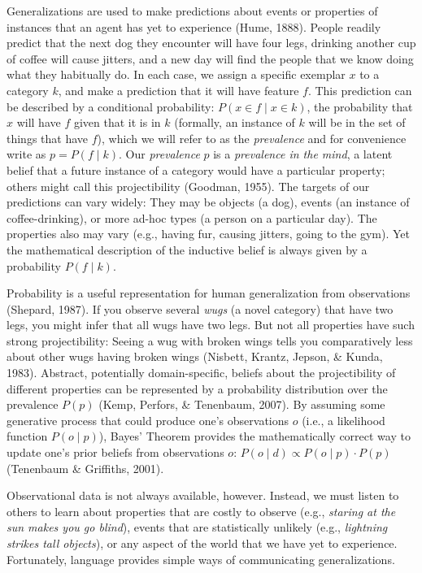 \documentclass[english,,man,floatsintext]{apa6}
\theoremstyle{definition}
\theoremstyle{definition}
\theoremstyle{definition}
\theoremstyle{remark}
\begin{document}
Generalizations are used to make predictions about events or properties
of instances that an agent has yet to experience (Hume, 1888). People
readily predict that the next dog they encounter will have four legs,
drinking another cup of coffee will cause jitters, and a new day will
find the people that we know doing what they habitually do. In each
case, we assign a specific exemplar \(x\) to a category \(k\), and make
a prediction that it will have feature \(f\). This prediction can be
described by a conditional probability: \(P(x \in f \mid x \in k)\), the
probability that \(x\) will have \(f\) given that it is in \(k\)
(formally, an instance of \(k\) will be in the set of things that have
\(f\)), which we will refer to as the \emph{prevalence} and for
convenience write as \(p = P(f \mid k)\). Our \emph{prevalence} \(p\) is
a \emph{prevalence in the mind}, a latent belief that a future instance
of a category would have a particular property; others might call this
projectibility (Goodman, 1955). The targets of our predictions can vary
widely: They may be objects (a dog), events (an instance of
coffee-drinking), or more ad-hoc types (a person on a particular day).
The properties also may vary (e.g., having fur, causing jitters, going
to the gym). Yet the mathematical description of the inductive belief is
always given by a probability \(P(f \mid k)\).

Probability is a useful representation for human generalization from
observations (Shepard, 1987). If you observe several \emph{wugs} (a
novel category) that have two legs, you might infer that all wugs have
two legs. But not all properties have such strong projectibility: Seeing
a wug with broken wings tells you comparatively less about other wugs
having broken wings (Nisbett, Krantz, Jepson, \& Kunda, 1983). Abstract,
potentially domain-specific, beliefs about the projectibility of
different properties can be represented by a probability distribution
over the prevalence \(P(p)\) (Kemp, Perfors, \& Tenenbaum, 2007). By
assuming some generative process that could produce one's observations
\(o\) (i.e., a likelihood function \(P(o \mid p)\)), Bayes' Theorem
provides the mathematically correct way to update one's prior beliefs
from observations \(o\): \(P(o \mid d) \propto P(o \mid p) \cdot P(p)\)
(Tenenbaum \& Griffiths, 2001).

Observational data is not always available, however. Instead, we must
listen to others to learn about properties that are costly to observe
(e.g., \emph{staring at the sun makes you go blind}), events that are
statistically unlikely (e.g., \emph{lightning strikes tall objects}), or
any aspect of the world that we have yet to experience. Fortunately,
language provides simple ways of communicating generalizations.
\end{document}
